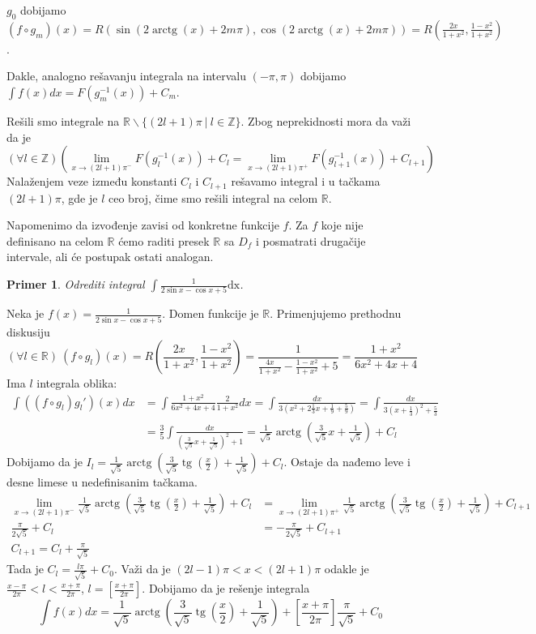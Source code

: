 \documentclass{article}
\newtheorem{prim}{Primer}[section]
\DeclareMathOperator{\tg}{tg}
\DeclareMathOperator{\arctg}{arctg}
\begin{document}
$g_0$ dobijamo $(f\circ g_m)(x)=R(\sin(2\arctg(x)+2m\pi),\cos(2\arctg(x)+2m\pi))=R(\frac{2x}{1+x^2},\frac{1-x^2}{1+x^2})$.\par
Dakle, analogno rešavanju integrala na intervalu $(-\pi,\pi)$ dobijamo  $\int f(x)dx=F(g_m^{-1}(x))+C_m$.\par
Rešili smo integrale na $\mathbb{R}\backslash\{(2l+1)\pi\ |\ l\in\mathbb{Z}\}$. Zbog neprekidnosti mora da važi da
je $$(\forall l\in\mathbb{Z})(\lim_{x\to (2l+1)\pi^{-}}F(g_l^{-1}(x))+C_{l}=\lim_{x\to (2l+1)\pi^{+}}F(g_{l+1}^{-1}(x))+C_{l+1})$$
Nalaženjem veze između konstanti $C_l$ i $C_{l+1}$ rešavamo integral i u tačkama $(2l+1)\pi$, gde je $l$ ceo broj, čime smo rešili integral
na celom $\mathbb{R}$.\par
Napomenimo da izvođenje zavisi od konkretne funkcije $f$. Za $f$ koje nije definisano na celom $\mathbb{R}$ ćemo raditi presek $\mathbb{R}$ sa $D_f$ i
posmatrati drugačije intervale, ali će postupak ostati analogan.
\begin{primbox}
    \begin{prim}
        Odrediti integral $\int\frac{1}{2\sin{x}-\cos{x}+5}\text{dx}$.
    \end{prim}
    Neka je $f(x)=\frac{1}{2\sin{x}-\cos{x}+5}$. Domen funkcije je $\mathbb{R}$. Primenjujemo prethodnu diskusiju
    $$(\forall l\in\mathbb{R})\ (f\circ g_l)(x)=R(\frac{2x}{1+x^2},\frac{1-x^2}{1+x^2})= \frac{1}{\frac{4x}{1+x^2}-\frac{1-x^2}{1+x^2}+5}=\frac{1+x^2}{6x^2+4x+4}$$
    Ima $l$ integrala oblika:
    \begin{align*}
        \int ((f\circ g_l)g_l')(x)dx & =\int\frac{1+x^2}{6x^2+4x+4}\frac{2}{1+x^2}dx=\int \frac{dx}{3(x^2+2\frac{1}{3}x+\frac{1}{9}+\frac{5}{9})}=\int\frac{dx}{3(x+\frac{1}{3})^2+\frac{5}{3}} \\
                                     & =\frac{3}{5}\int\frac{dx}{(\frac{3}{\sqrt{5}}x+\frac{1}{\sqrt{5}})^2+1}=\frac{1}{\sqrt{5}}\arctg(\frac{3}{\sqrt{5}}x+\frac{1}{\sqrt{5}})+C_l
    \end{align*}
    Dobijamo da je $I_l =\frac{1}{\sqrt{5}}\arctg(\frac{3}{\sqrt{5}}\tg(\frac{x}{2})+\frac{1}{\sqrt{5}})+C_l$. Ostaje da nađemo leve i desne limese u nedefinisanim tačkama.
    \begin{align*}
        \lim_{x\to (2l+1)\pi^{-}}\frac{1}{\sqrt{5}}\arctg(\frac{3}{\sqrt{5}}\tg(\frac{x}{2})+\frac{1}{\sqrt{5}})+C_l & =\lim_{x\to (2l+1)\pi^{+}}\frac{1}{\sqrt{5}}\arctg(\frac{3}{\sqrt{5}}\tg(\frac{x}{2})+\frac{1}{\sqrt{5}})+C_{l+1} \\
        \frac{\pi}{2\sqrt{5}}+C_l                                                                                    & =-\frac{\pi}{2\sqrt{5}}+C_{l+1}                                                                                   \\
        C_{l+1}=C_l+\frac{\pi}{\sqrt{5}}
    \end{align*}
    Tada je $C_l=\frac{l\pi}{\sqrt{5}}+C_0$. Važi da je $(2l-1)\pi<x<(2l+1)\pi$ odakle je
    $\frac{x-\pi}{2\pi}<l<\frac{x+\pi}{2\pi}$, $l=[\frac{x+\pi}{2\pi}]$.
    Dobijamo da je rešenje integrala
    $$\int f(x)dx=\frac{1}{\sqrt{5}}\arctg(\frac{3}{\sqrt{5}}\tg(\frac{x}{2})+\frac{1}{\sqrt{5}})+[\frac{x+\pi}{2\pi}]\frac{\pi}{\sqrt{5}}+C_0$$
\end{primbox}
\end{document}
